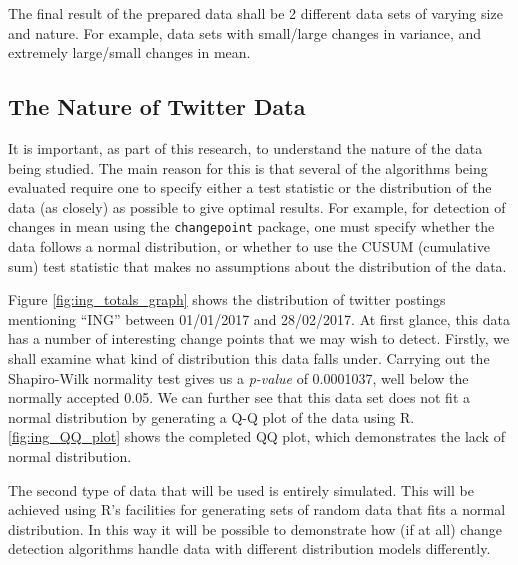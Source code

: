 \documentclass{uvamscse}	%
\begin{document}
The final result of the prepared data shall be 2 different data sets of varying size and nature. For example, data sets with small/large changes in variance, and extremely large/small changes in mean.

\subsection{The Nature of Twitter Data}

It is important, as part of this research, to understand the nature of the data being studied. The main reason for this is that several of the algorithms being evaluated require one to specify either a test statistic or the distribution of the data (as closely) as possible to give optimal results. For example, for detection of changes in mean using the \texttt{changepoint} package, one must specify whether the data follows a normal distribution, or whether to use the CUSUM (cumulative sum) test statistic that makes no assumptions about the distribution of the data.


Figure \ref{fig:ing_totals_graph} shows the distribution of twitter postings mentioning ``ING'' between 01/01/2017 and 28/02/2017. At first glance, this data has a number of interesting change points that we may wish to detect. Firstly, we shall examine what kind of distribution this data falls under. Carrying out the Shapiro-Wilk normality test gives us a \emph{p-value} of 0.0001037, well below the normally accepted 0.05. We can further see that this data set does not fit a normal distribution by generating a Q-Q plot of the data using R. \ref{fig:ing_QQ_plot} shows the completed QQ plot, which demonstrates the lack of normal distribution.


The second type of data that will be used is entirely simulated. This will be achieved using R's facilities for generating sets of random data that fits a normal distribution. In this way it will be possible to demonstrate how (if at all) change detection algorithms handle data with different distribution models differently.
\end{document}
